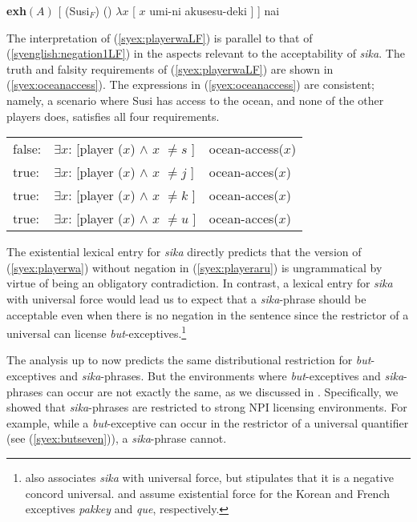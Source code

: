 \documentclass[output=paper]{langscibook}
\begin{document}
\ea \label{syex:playerwaLF}
    \textbf{exh}$(A)$ [   (Susi$_F$) () $\lambda x$ [ $x$ umi-ni akusesu-deki ] ] nai \z

The interpretation of (\ref{syex:playerwaLF}) is parallel to that of (\ref{syenglish:negation1LF}) in the aspects relevant to the acceptability of \emph{sika}.
The truth and falsity requirements of (\ref{syex:playerwaLF}) are shown in (\ref{syex:oceanaccess}).
The expressions in (\ref{syex:oceanaccess}) are consistent; namely, a scenario where Susi has access to the ocean, and none of the other players does, satisfies all four requirements.

\ea \label{syex:oceanaccess}
    \begin{tabular}[t]{@{}l@{~}l@{~\&~}l@{}}
    false: & $\exists x$: [player ($x$) $\land$ $x$ $\neq s$ ] & ocean-access($x$)\\
    true:  & $\exists x$: [player ($x$) $\land$ $x$ $\neq j$ ] & ocean-acces($x$)\\
    true:  & $\exists x$: [player ($x$) $\land$ $x$ $\neq k$ ] & ocean-acces($x$)\\
    true:  & $\exists x$: [player ($x$) $\land$ $x$ $\neq u$ ] & ocean-acces($x$)\\
    \end{tabular}
\z


The existential lexical entry for \emph{sika} directly predicts that the version of (\ref{syex:playerwa}) without negation in (\ref{syex:playeraru}) is ungrammatical by virtue of being an obligatory contradiction. In contrast, a lexical entry for \emph{sika} with universal force \citep{alonso-ovalle04a,kawahara08a,yoshimura06a} would lead us to expect that a \emph{sika}-phrase should be acceptable even when there is no negation in the sentence since the restrictor of a universal can license \emph{but}-exceptives.\footnote{\citet{shimoyama11} also associates \emph{sika} with universal force, but stipulates that it is a negative concord universal.  \citet{sells01a} and \citet{fintel07a} assume existential force for the Korean and French exceptives \emph{pakkey} and \emph{que}, respectively.} 

The analysis up to now predicts the same distributional restriction for \emph{but}-exceptives and \emph{sika}-phrases.
But the environments where \emph{but}-exceptives and \emph{sika}-phrases can occur are not exactly the same, as we discussed in .
Specifically, we showed that \emph{sika}-phrases are restricted to strong NPI licensing environments. 
For example,  while a \emph{but}-exceptive can occur in the restrictor of a universal quantifier (see (\ref{syex:butseven})), a \emph{sika}-phrase cannot.
\end{document}
